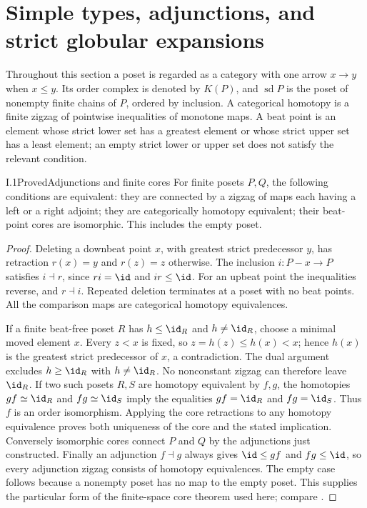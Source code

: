 \section{Simple types, adjunctions, and strict globular expansions}
\label{sec:I}
\providecommand{\sd}{\operatorname{sd}}
\providecommand{\Core}{\operatorname{core}}
\providecommand{\Pos}{\mathrm{Pos}}
\providecommand{\Sf}{\mathcal F}
Throughout this section a poset is regarded as a category with one arrow
$x\to y$ when $x\leq y$. Its order complex is denoted by $K(P)$, and
$\sd P$ is the poset of nonempty finite chains of $P$, ordered by inclusion.
A categorical homotopy is a finite zigzag of pointwise inequalities of
monotone maps. A beat point is an element whose strict lower set has a
greatest element or whose strict upper set has a least element; an empty
strict lower or upper set does not satisfy the relevant condition.

\begin{claim}{I.1}{Proved}{Adjunctions and finite cores}
For finite posets $P,Q$, the following conditions are equivalent: they are
connected by a zigzag of maps each having a left or a right adjoint; they
are categorically homotopy equivalent; their beat-point cores are
isomorphic. This includes the empty poset.
\end{claim}
\begin{proof}
Deleting a downbeat point $x$, with greatest strict predecessor $y$, has
retraction $r(x)=y$ and $r(z)=z$ otherwise. The inclusion $i:P-x\to P$
satisfies $i\dashv r$, since $ri=\id$ and $ir\leq\id$. For an upbeat
point the inequalities reverse, and $r\dashv i$. Repeated deletion
terminates at a poset with no beat points. All the comparison maps are
categorical homotopy equivalences.

If a finite beat-free poset $R$ has $h\leq\id_R$ and $h\neq\id_R$,
choose a minimal moved element $x$. Every $z<x$ is fixed, so
$z=h(z)\leq h(x)<x$; hence $h(x)$ is the greatest strict predecessor of
$x$, a contradiction. The dual argument excludes $h\geq\id_R$ with
$h\neq\id_R$. No nonconstant zigzag can therefore leave $\id_R$.
If two such posets $R,S$ are homotopy equivalent by $f,g$, the homotopies
$gf\simeq\id_R$ and $fg\simeq\id_S$ imply the equalities $gf=\id_R$
and $fg=\id_S$. Thus $f$ is an order isomorphism. Applying the core
retractions to any homotopy equivalence proves both uniqueness of the
core and the stated implication. Conversely isomorphic cores connect
$P$ and $Q$ by the adjunctions just constructed. Finally an adjunction
$f\dashv g$ always gives $\id\leq gf$ and $fg\leq\id$, so every
adjunction zigzag consists of homotopy equivalences. The empty case
follows because a nonempty poset has no map to the empty poset.
This supplies the particular form of the finite-space core theorem used
here; compare \cite[Section~2]{I_BarmakMinian2008}.
\end{proof}

